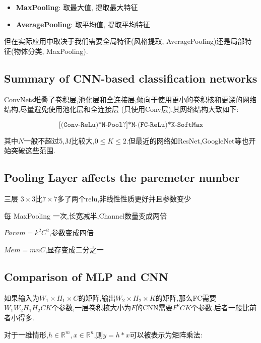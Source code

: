 \begin{itemize}
	\item \textbf{MaxPooling}: 取最大值, 提取最大特征
	\item \textbf{AveragePooling}: 取平均值, 提取平均特征
\end{itemize}
但在实际应用中取决于我们需要全局特征(风格提取, AveragePooling)还是局部特征(物体分类, MaxPooling).

\subsection{Summary of CNN-based classification networks}

ConvNets堆叠了卷积层,池化层和全连接层,倾向于使用更小的卷积核和更深的网络结构,尽量避免使用池化层和全连接层 (只使用Conv层).其网络结构大致如下:

\[\texttt{[(Conv-ReLu)*N-Pool?]*M-(FC-ReLu)*K-SoftMax}\]

其中$N$一般不超过5,$M$比较大,$0\le K \le 2$.但最近的网络如ResNet,GoogleNet等也开始突破这些范围.

\subsection{Pooling Layer affects the paremeter number}

三层 $3\times3$比$7\times7$多了两个relu,非线性性质更好并且参数变少

每 MaxPooling 一次,长宽减半,Channel数量变成两倍

$Param=k^2C^2$,参数变成四倍

$Mem=mnC$,显存变成二分之一

\subsection{Comparison of MLP and CNN}

如果输入为$W_1 \times H_1 \times C$的矩阵,输出$W_2 \times H_2 \times K$的矩阵,那么FC需要$W_1W_2H_1H_2CK$个参数,一层卷积核大小为$F$的CNN需要$F^2CK$个参数.后者一般比前者小得多.

对于一维情形,$h \in \mathbb R^m, x\in \mathbb R^n$,则$y = h * x$可以被表示为矩阵乘法:


